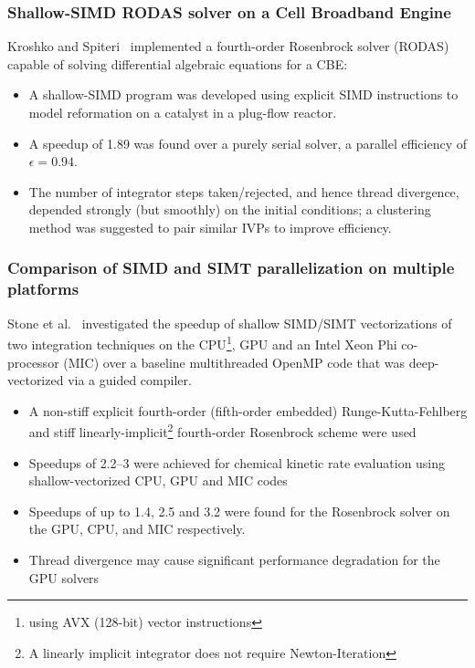 \documentclass{beamer}
\newcounter{stiff}
\begin{document}
\begin{frame}
 \frametitle{Shallow-SIMD RODAS solver on a Cell Broadband Engine}
 Kroshko and Spiteri~ implemented a fourth-order Rosenbrock solver (RODAS) capable of solving differential algebraic equations for a CBE:
 \begin{itemize}
  \item A shallow-SIMD program was developed using explicit SIMD instructions to model  reformation on a  catalyst in a plug-flow reactor.
  \item A speedup of \SI{1.89}{\times} was found over a purely serial solver, a parallel efficiency of $\epsilon = 0.94$.
  \item The number of integrator steps taken\slash rejected, and hence thread divergence, depended strongly (but smoothly) on the initial conditions; a clustering method was suggested to pair similar IVPs to improve efficiency.
 \end{itemize}
\end{frame}

\begin{frame}[allowframebreaks]
 \frametitle{Comparison of SIMD and SIMT parallelization on multiple platforms}
 Stone et al.~ investigated the speedup of shallow SIMD\slash SIMT vectorizations of two integration techniques on the CPU\footnote{using AVX (128-bit) vector instructions}, GPU and an Intel Xeon Phi co-processor (MIC) over a baseline multithreaded OpenMP code that was deep-vectorized via a guided compiler.
 \begin{itemize}
  \item A non-stiff explicit fourth-order (fifth-order embedded) Runge-Kutta-Fehlberg and stiff linearly-implicit\footnote{A linearly implicit integrator does not require Newton-Iteration} fourth-order Rosenbrock scheme were used
  \item Speedups of \SIrange{2.2}{3}{\times} were achieved for chemical kinetic rate evaluation using shallow-vectorized CPU, GPU and MIC codes
  \item Speedups of up to \SI{1.4}{\times}, \SI{2.5}{\times} and \SI{3.2}{\times} were found for the Rosenbrock solver on the GPU, CPU, and MIC respectively.
  \item Thread divergence may cause significant performance degradation for the GPU solvers
 \end{itemize}
\end{frame}
\end{document}
